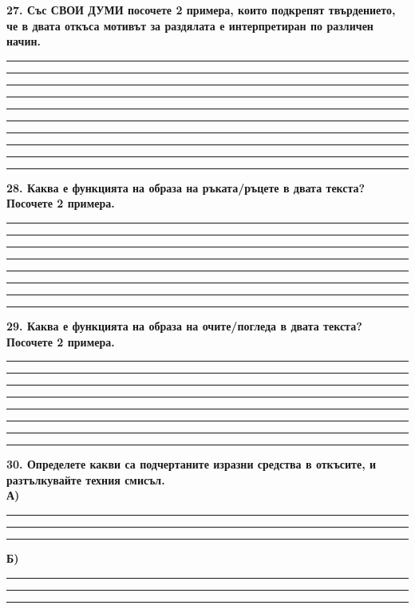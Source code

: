 \documentclass[12pt,a4paper]{article}
\begin{document}
\vspace{0.6cm}

\noindent
\textbf{27. Със СВОИ ДУМИ посочете 2 примера, които подкрепят твърдението, че в двата откъса мотивът за раздялата е интерпретиран по различен начин.} \\
\noindent\rule{\linewidth}{0.4pt}
\noindent\rule{\linewidth}{0.4pt}
\noindent\rule{\linewidth}{0.4pt}
\noindent\rule{\linewidth}{0.4pt}
\noindent\rule{\linewidth}{0.4pt}
\noindent\rule{\linewidth}{0.4pt}
\noindent\rule{\linewidth}{0.4pt}
\noindent\rule{\linewidth}{0.4pt}
\noindent\rule{\linewidth}{0.4pt}
\noindent\rule{\linewidth}{0.4pt}

\vspace{0.6cm}

\noindent
\textbf{28. Каква е функцията на образа на ръката/ръцете в двата текста? Посочете 2 примера.} \\
\noindent\rule{\linewidth}{0.4pt}
\noindent\rule{\linewidth}{0.4pt}
\noindent\rule{\linewidth}{0.4pt}
\noindent\rule{\linewidth}{0.4pt}
\noindent\rule{\linewidth}{0.4pt}
\noindent\rule{\linewidth}{0.4pt}
\noindent\rule{\linewidth}{0.4pt}
\noindent\rule{\linewidth}{0.4pt}

\vspace{0.6cm}

\noindent
\textbf{29. Каква е функцията на образа на очите/погледа в двата текста? Посочете 2 примера.}\\
\noindent\rule{\linewidth}{0.4pt}
\noindent\rule{\linewidth}{0.4pt}
\noindent\rule{\linewidth}{0.4pt}
\noindent\rule{\linewidth}{0.4pt}
\noindent\rule{\linewidth}{0.4pt}
\noindent\rule{\linewidth}{0.4pt}
\noindent\rule{\linewidth}{0.4pt}
\noindent\rule{\linewidth}{0.4pt}

\vspace{0.6cm}

\noindent
\textbf{30. Определете какви са подчертаните изразни средства в откъсите, и разтълкувайте техния смисъл.} \\
\textbf{А)} \dotfill
\vspace{0.2cm}
\noindent\rule{\linewidth}{0.4pt}
\noindent\rule{\linewidth}{0.4pt}
\noindent\rule{\linewidth}{0.4pt}

\vspace{0.3cm}

\noindent
\textbf{Б)} \dotfill
\vspace{0.2cm}
\noindent\rule{\linewidth}{0.4pt}
\noindent\rule{\linewidth}{0.4pt}
\noindent\rule{\linewidth}{0.4pt}

\vspace{0.6cm}
\end{document}
